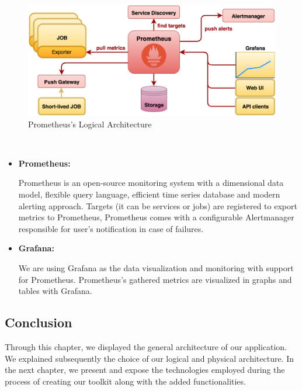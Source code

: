 \begin{figure}[!htpb] 
\begin{center}
\includegraphics[width=6.0 in]{images/ATHENAprom-arch.png}
\caption{Prometheus's Logical Architecture}
\label{logic_archpro}
\end{center}
\end{figure}~

\begin{itemize}
    \item\textbf{Prometheus:}
    
    Prometheus is an open-source monitoring system with a dimensional data model, flexible query language, efficient time series database and modern alerting approach. Targets (it can be services or jobs) are registered to export metrics to Prometheus, Prometheus comes with a configurable Alertmanager responsible for user's notification in case of failures.
    \item\textbf{Grafana:}
    
    We are using Grafana as the data visualization and monitoring with support for Prometheus. Prometheus's gathered metrics are visualized in graphs and tables with Grafana.
\end{itemize}





\subsection *{Conclusion}
Through this chapter, we displayed the general architecture of our application. We explained subsequently the choice of our logical and physical architecture. In the next chapter, we present and expose the technologies employed during the process of creating our toolkit along with the added functionalities.


